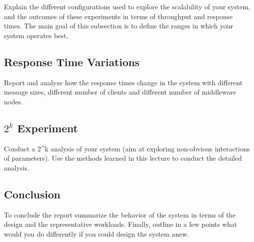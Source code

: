 \documentclass[11pt]{article}
\begin{document}
Explain the different configurations used to explore the scalability of
your system, and the outcomes of these experiments in terms of
throughput and response times. The main goal of this subsection is to
define the ranges in which your system operates best.

\subsection{Response Time Variations}\label{sec:response-time-variations}

Report and analyze how the response times change in the system with
different message sizes, different number of clients and different
number of middleware nodes.

\subsection{$2^k$ Experiment}\label{sec:k-experiment}

Conduct a 2\^{}k analysis of your system (aim at exploring non-obvious
interactions of parameters). Use the methods learned in this lecture to
conduct the detailed analysis.

\subsection{Conclusion}\label{sec:conclusion}

To conclude the report summarize the behavior of the system in terms of
the design and the representative workloads. Finally, outline in a few
points what would you do differently if you could design the system
anew.
\end{document}
